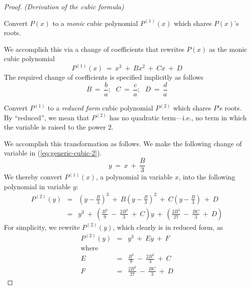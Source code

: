 \begin{proof} {\it (Derivation of the cubic formula)}

\smallskip

 Convert $P(x)$ to a {\em monic} cubic polynomial $P^{(1)}(x)$ which shares $P(x)$'s roots.

\smallskip

\noindent
We accomplish this via a change of coefficients that rewrites $P(x)$ as the monic cubic polynomial
\begin{equation}
\label{eq:generic-cubic-2}
P^{(1)}(x) \ = \  x^3 \ + \ Bx^2 \ + \ Cx \ + \ D
\end{equation}
The required change of coefficients is specified implicitly as follows
\[
B \ = \ \frac{b}{a}; \ \ \
C \ = \ \frac{c}{a}; \ \ \
D \ = \ \frac{d}{a}
\]

\medskip


 Convert $P^{(1)}$ to a {\em reduced form} cubic polynomial $P^{(2)}$ which shares $P$'s roots.  By ``reduced'', we mean that $P^{(2)}$ has no quadratic term---i.e., no term in which the variable is raised to the power $2$.

\smallskip

\noindent
We accomplish this transformation as follows.  We make the following change of variable in (\ref{eq:generic-cubic-2}).
\begin{equation}
\label{eq:cubic-substitute-y-for-x} 
y \ = \ x \ + \ \frac{B}{3}
\end{equation}
We thereby convert $P^{(1)}(x)$, a polynomial in variable $x$, into the following polynomial in variable $y$:
\begin{eqnarray}
\nonumber
P^{(2)}(y) & = &  \left(y - \frac{B}{3} \right)^3
 \ + \ B \left(y - \frac{B}{3} \right)^2
 \ + \ C \left(y - \frac{B}{3} \right) \ + \ D \\
\label{eq:generic-cubic-3}
           & = &
y^3 \ + \
\left( \frac{B^2}{9} \ - \ \frac{2B^2}{3} \ + \ C  \right) y
\ + \ \left( \frac{2 B^3}{27}  \ - \ \frac{BC}{3}  \ + \ D \right)
\end{eqnarray}
For simplicity, we rewrite $P^{(2)}(y)$, which clearly is in reduced form, as
\begin{eqnarray}
\label{eq:generic-cubic-4}
P^{(2)}(y) & = & y^3 \ + \ E y \ + \ F \\
\nonumber
\mbox{where} & & \\
\nonumber
E & = & \frac{B^2}{9} \ - \ \frac{2B^2}{3} \ + \ C \\
\nonumber
F & = & \frac{2 B^3}{27}  \ - \ \frac{BC}{3}  \ + \ D
\end{eqnarray}



\end{proof}
